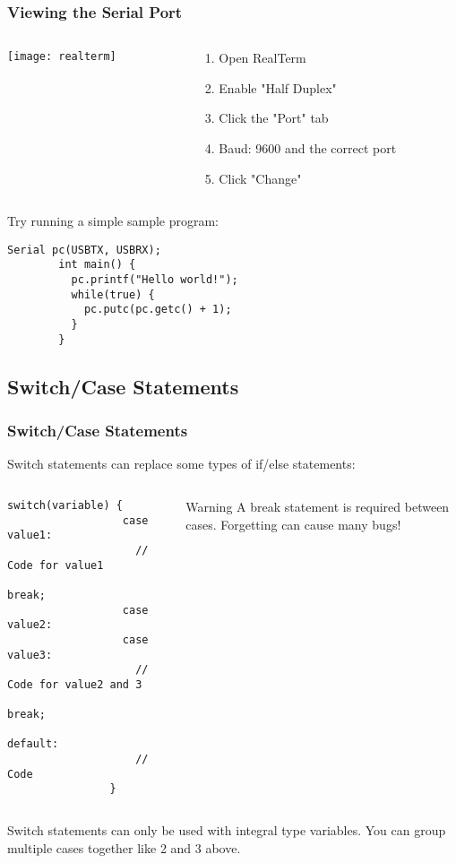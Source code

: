 \begin{frame}[fragile]
	\frametitle{Viewing the Serial Port}
	\begin{columns}[T]
		\begin{column}{0.5\textwidth}
			\texttt{[image: realterm]}
		\end{column}
		\begin{column}{0.5\textwidth}
			\begin{enumerate}
				\item Open RealTerm
				\item Enable "Half Duplex"
				\item Click the "Port" tab
				\item Baud: 9600 and the correct port
				\item Click "Change"
			\end{enumerate}
		\end{column}
	\end{columns}
	\vfill
	Try running a simple sample program:
	\begin{lstlisting}[numbers=none]
		Serial pc(USBTX, USBRX);
		int main() {
		  pc.printf("Hello world!");
		  while(true) {
		    pc.putc(pc.getc() + 1);
		  }
		}
	\end{lstlisting}
\end{frame}

\subsection{Switch/Case Statements}
\label{sub:switch_case}
\begin{frame}[fragile]
	\frametitle{Switch/Case Statements}
	Switch statements can replace some types of if/else statements:
	\begin{columns}[c]
		\begin{column}{0.5\textwidth}
			\begin{lstlisting}[numbers=none]
				switch(variable) {
				  case value1:
				    // Code for value1
				    break;
				  case value2:
				  case value3:
				  	// Code for value2 and 3
				  	break;
				  default:
				    // Code
				}
			\end{lstlisting}
		\end{column}
		\begin{column}{0.5\textwidth}
			\begin{block}{Warning}
				A break statement is required between cases. Forgetting can cause many bugs!
			\end{block}
		\end{column}
	\end{columns}
	Switch statements can only be used with integral type variables.
	You can group multiple cases together like 2 and 3 above.
\end{frame}

